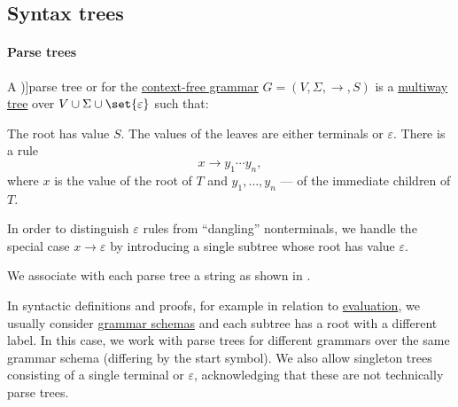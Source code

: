 \subsection{Syntax trees}\label{subsec:syntax_trees}

\paragraph{Parse trees}

\begin{definition}\label{def:parse_tree}
  A \term[ru=дерево вывода (\cite[81]{Гладкий1973Языки})]{parse tree} or  for the \hyperref[def:chomsky_hierarchy/context_free]{context-free grammar} \( G = (V, \Sigma, \to, S) \) is a \hyperref[def:multiway_tree]{multiway tree} over \( V \cup \Sigma \cup \set{ \varepsilon } \) such that:
  \begin{thmenum}
     The root has value \( S \).
     The values of the leaves are either terminals or \( \varepsilon \).
     There is a rule
    \begin{equation*}
      x \to y_1 \cdots y_n,
    \end{equation*}
    where \( x \) is the value of the root of \( T \) and \( y_1, \ldots, y_n \) --- of the immediate children of \( T \).

    In order to distinguish \( \varepsilon \) rules from \enquote{dangling} nonterminals, we handle the special case \( x \to \varepsilon \) by introducing a single subtree whose root has value \( \varepsilon \).
  \end{thmenum}
\end{definition}
\begin{comments}
  \item We associate with each parse tree a string as shown in .
\end{comments}

\begin{remark}\label{rem:parse_tree_roots}
  In syntactic definitions and proofs, for example in relation to \hyperref[con:evaluation]{evaluation}, we usually consider \hyperref[def:formal_grammar/schema]{grammar schemas} and each subtree has a root with a different label. In this case, we work with parse trees for different grammars over the same grammar schema (differing by the start symbol). We also allow singleton trees consisting of a single terminal or \( \varepsilon \), acknowledging that these are not technically parse trees.
\end{remark}

